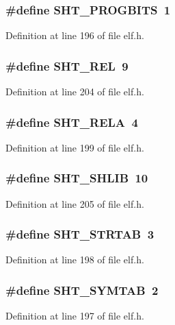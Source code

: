 \subsubsection[{SHT\_\-PROGBITS}]{\setlength{\rightskip}{0pt plus 5cm}\#define SHT\_\-PROGBITS~1}\label{elf_8h_4bff22edbae51353ba9b3572d424b91a}




Definition at line 196 of file elf.h.
\subsubsection[{SHT\_\-REL}]{\setlength{\rightskip}{0pt plus 5cm}\#define SHT\_\-REL~9}\label{elf_8h_2aea2ed985f81f13a157fe2da02a621a}




Definition at line 204 of file elf.h.
\subsubsection[{SHT\_\-RELA}]{\setlength{\rightskip}{0pt plus 5cm}\#define SHT\_\-RELA~4}\label{elf_8h_bf2fc2781a2869352c2ffa0555f34118}




Definition at line 199 of file elf.h.
\subsubsection[{SHT\_\-SHLIB}]{\setlength{\rightskip}{0pt plus 5cm}\#define SHT\_\-SHLIB~10}\label{elf_8h_ce0ce008ff50406077a9450174fe55a5}




Definition at line 205 of file elf.h.
\subsubsection[{SHT\_\-STRTAB}]{\setlength{\rightskip}{0pt plus 5cm}\#define SHT\_\-STRTAB~3}\label{elf_8h_f4b916dc4ca5016fb5c374068002a532}




Definition at line 198 of file elf.h.
\subsubsection[{SHT\_\-SYMTAB}]{\setlength{\rightskip}{0pt plus 5cm}\#define SHT\_\-SYMTAB~2}\label{elf_8h_4add7784e43ec3d3b9c09d3ffc476a81}




Definition at line 197 of file elf.h.